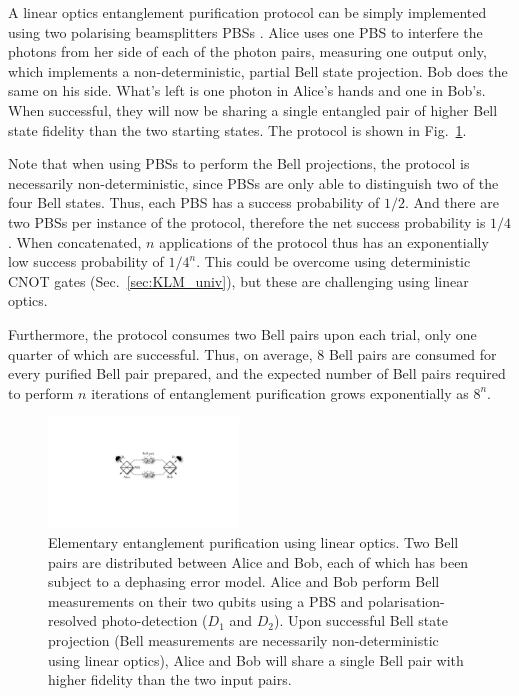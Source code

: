 A linear optics entanglement purification protocol can be simply implemented using two polarising beamsplitters PBSs \cite{bib:Pan01, bib:Pan03}. Alice uses one PBS to interfere the photons from her side of each of the photon pairs, measuring one output only, which implements a non-deterministic, partial Bell state projection. Bob does the same on his side. What's left is one photon in Alice's hands and one in Bob's. When successful, they will now be sharing a single entangled pair of higher Bell state fidelity than the two starting states. The protocol is shown in Fig.~\ref{fig:ent_purif_prot}.

Note that when using PBSs to perform the Bell projections, the protocol is necessarily non-deterministic, since PBSs are only able to distinguish two of the four Bell states. Thus, each PBS has a success probability of $1/2$. And there are two PBSs per instance of the protocol, therefore the net success probability is $1/4$. When concatenated, $n$ applications of the protocol thus has an exponentially low success probability of $1/4^n$. This could be overcome using deterministic CNOT gates (Sec.~\ref{sec:KLM_univ}), but these are challenging using linear optics.

Furthermore, the protocol consumes two Bell pairs upon each trial, only one quarter of which are successful. Thus, on average, 8 Bell pairs are consumed for every purified Bell pair prepared, and the expected number of Bell pairs required to perform $n$ iterations of entanglement purification grows exponentially as $8^n$.

\begin{figure}[!htbp]
\includegraphics[width=0.45\textwidth]{ent_purif_prot}
\caption{Elementary entanglement purification using linear optics. Two Bell pairs are distributed between Alice and Bob, each of which has been subject to a dephasing error model. Alice and Bob perform Bell measurements on their two qubits using a PBS and polarisation-resolved photo-detection ($D_1$ and $D_2$). Upon successful Bell state projection (Bell measurements are necessarily non-deterministic using linear optics), Alice and Bob will share a single Bell pair with higher fidelity than the two input pairs.} \label{fig:ent_purif_prot}
\end{figure}

